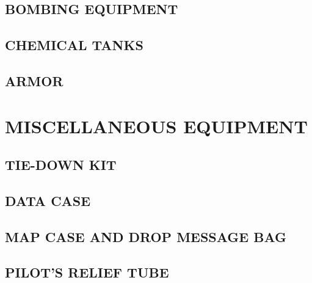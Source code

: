 \subsection{BOMBING EQUIPMENT}
\subsection{CHEMICAL TANKS}
\subsection{ARMOR}


\section{MISCELLANEOUS EQUIPMENT}
\subsection{TIE-DOWN KIT}
\subsection{DATA CASE}
\subsection{MAP CASE AND DROP MESSAGE BAG}
\subsection{PILOT'S RELIEF TUBE}


\cleardoublepage{}